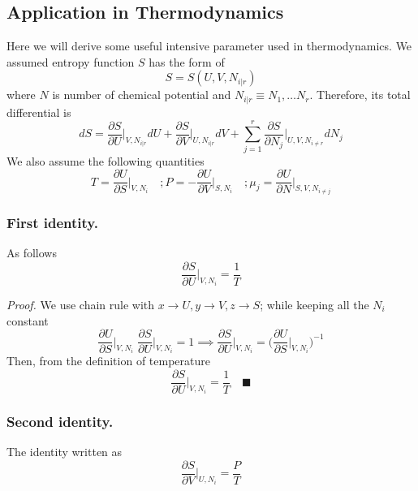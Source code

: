\documentclass[../../../Main.tex]{subfiles}
\begin{document}
\subsection*{Application in Thermodynamics}
Here we will derive some useful intensive parameter used in thermodynamics. We assumed entropy function $S$ has the form of 
\begin{equation*}
    S=S(U, V, N_{i|r} )
\end{equation*}
where $N$ is number of chemical potential and $N_{i|r}\equiv N_1,\dots N_r$. Therefore, its total differential is 
\begin{equation*}
    dS=\frac{\partial S}{\partial U}\bigg|_{V, N_{i|r} }dU + \frac{\partial S}{ \partial V}\bigg|_{U, N_{i|r} }dV +\sum_{j=1}^{r}\frac{\partial S}{ \partial N_j}\bigg|_{U,V, N_{i\neq r} }dN_j
\end{equation*}
We also assume the following quantities
\begin{equation*}
    T=\frac{\partial U}{\partial S}\bigg|_{V, N_{i} }\quad
    ;P=-\frac{\partial U}{\partial V}\bigg|_{S, N_{i} }\quad
    ;\mu_j=\frac{\partial U}{\partial N}\bigg|_{S, V, N_{i\neq j} }
\end{equation*}

\subsubsection*{First identity.} As follows
\begin{equation*}
    \frac{\partial S}{\partial U}\bigg|_{V, N_i}=\frac{1}{T}
\end{equation*}

\emph{Proof.} We use chain rule with $x\rightarrow U,  y \rightarrow V ,z \rightarrow S$; while keeping all the $N_i$ constant
\begin{equation*}
    \frac{\partial U}{\partial S}\bigg|_{V,N_i}\;\frac{\partial S}{\partial U}\bigg|_{V,N_i}=1\implies
    \frac{\partial S}{\partial U}\bigg|_{V,N_i}=\biggl(\frac{\partial U}{\partial S}\bigg|_{V,N_i}\biggr)^{-1}
\end{equation*}
Then, from the definition of temperature
\begin{equation*}
    \frac{\partial S}{\partial U}\bigg|_{V,N_i}=\frac{1}{T}\quad \blacksquare
\end{equation*}

\subsubsection*{Second identity.} The identity written as
\begin{equation*}
    \frac{\partial S}{\partial V}\bigg|_{U, N_i}=\frac{P}{T}
\end{equation*}
\end{document}
